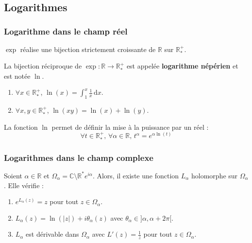 	\subsection{Logarithmes}
	
	\subsubsection{Logarithme dans le champ réel}
	
	
	\begin{proposition}
		$\exp$ réalise une bijection strictement croissante de $\mathbb{R}$ sur $\mathbb{R}_*^+$.
	\end{proposition}
	
	\begin{definition}
		La bijection réciproque de $\exp : \mathbb{R} \rightarrow \mathbb{R}_*^+$ est appelée \textbf{logarithme népérien} et est notée $\ln$.
	\end{definition}
	
	\begin{theorem}
		\begin{enumerate}[label=(\roman*)]
			\item $\forall x \in \mathbb{R}_*^+$, $\ln(x) = \int_1^x \frac{1}{x} \, \mathrm{d}x$.
			\item $\forall x, y \in \mathbb{R}_*^+$, $\ln(xy) = \ln(x) + \ln(y)$.
		\end{enumerate}
	\end{theorem}
	
	\begin{remark}
		La fonction $\ln$ permet de définir la mise à la puissance par un réel :
		\[ \forall t \in \mathbb{R}^+_*, \, \forall \alpha \in \mathbb{R}, \, t^\alpha = e^{\alpha \ln(t)} \]
	\end{remark}
	
	\subsubsection{Logarithmes dans le champ complexe}
	
	\reference[QUE]{81}
	
	\begin{theorem}
		Soient $\alpha \in \mathbb{R}$ et $\Omega_\alpha = \mathbb{C} \setminus \mathbb{R}^* e^{i\alpha}$. Alors, il existe une fonction $L_\alpha$ holomorphe sur $\Omega_\alpha$. Elle vérifie :
		\begin{enumerate}[label=(\roman*)]
			\item $e^{L_\alpha(z)} = z$ pour tout $z \in \Omega_\alpha$.
			\item $L_\alpha(z) = \ln(\vert z \vert) + i\theta_\alpha(z)$ avec $\theta_\alpha \in ]\alpha, \alpha + 2\pi[$.
			\item $L_\alpha$ est dérivable dans $\Omega_\alpha$ avec $L'(z) = \frac{1}{z}$ pour tout $z \in \Omega_\alpha$.
		\end{enumerate}
	\end{theorem}
	
